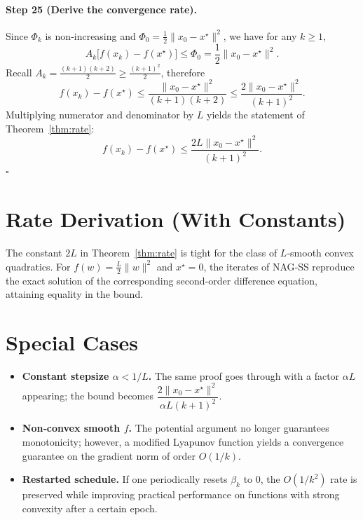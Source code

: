 \documentclass{article}
\begin{document}
\paragraph{Step 25 (Derive the convergence rate).}
Since $\Phi_{k}$ is non‑increasing and $\Phi_0 = \frac12\|x_0-x^\star\|^{2}$, we have for any $k\ge 1$,
\[
A_k\bigl[f(x_k)-f(x^\star)\bigr]
\le \Phi_0 = \frac12\|x_0-x^\star\|^{2}.
\]
Recall $A_k=\frac{(k+1)(k+2)}{2}\ge \frac{(k+1)^2}{2}$, therefore
\[
f(x_k)-f(x^\star)
\le \frac{\|x_0-x^\star\|^{2}}{(k+1)(k+2)}
\le \frac{2\|x_0-x^\star\|^{2}}{(k+1)^2}.
\]
Multiplying numerator and denominator by $L$ yields the statement of Theorem~\ref{thm:rate}:
\[
f(x_k)-f(x^\star)\le \frac{2L\|x_0-x^\star\|^{2}}{(k+1)^2}.
\] \hfill $\square$ \;[Step 25]

\section*{Rate Derivation (With Constants)}
The constant $2L$ in Theorem~\ref{thm:rate} is tight for the class of $L$‑smooth convex quadratics.  For $f(w)=\frac{L}{2}\|w\|^{2}$ and $x^\star=0$, the iterates of NAG‑SS reproduce the exact solution of the corresponding second‑order difference equation, attaining equality in the bound.

\section*{Special Cases}
\begin{itemize}
\item \textbf{Constant stepsize $\alpha<1/L$.} The same proof goes through with a factor $\alpha L$ appearing; the bound becomes $\dfrac{2\|x_0-x^\star\|^{2}}{\alpha L (k+1)^2}$.
\item \textbf{Non‑convex smooth $f$.} The potential argument no longer guarantees monotonicity; however, a modified Lyapunov function yields a convergence guarantee on the gradient norm of order $O(1/k)$.
\item \textbf{Restarted schedule.} If one periodically resets $\beta_k$ to $0$, the $O(1/k^2)$ rate is preserved while improving practical performance on functions with strong convexity after a certain epoch.
\end{itemize}
\end{document}
